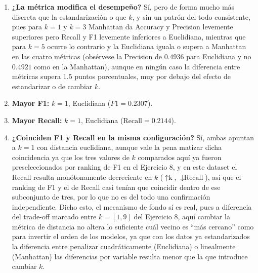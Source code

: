 \begin{enumerate}

\item \textbf{¿La métrica modifica el desempeño?}
Sí, pero de forma mucho más discreta que la estandarización o que $k$,
y sin un patrón del todo consistente, pues para $k=1$ y $k=3$ Manhattan
da Accuracy y Precision levemente superiores pero Recall y F1
levemente inferiores a Euclidiana, mientras que para $k=5$ ocurre lo
contrario y la Euclidiana iguala o supera a Manhattan en las cuatro
métricas (obsérvese la Precision de $0.4936$ para Euclidiana y no
$0.4921$ como en la Manhattan), aunque en ningún caso la diferencia entre
métricas supera $1.5$ puntos porcentuales, muy por debajo del efecto
de estandarizar o de cambiar $k$.

\item \textbf{Mayor F1:} $k=1$, Euclidiana ($F1=0.2307$).

\item \textbf{Mayor Recall:} $k=1$, Euclidiana ($\text{Recall}=0.2144$).

\item \textbf{¿Coinciden F1 y Recall en la misma configuración?}
Sí, ambas apuntan a $k=1$ con distancia euclidiana, aunque vale la pena
matizar dicha coincidencia ya que los tres valores de $k$ comparados
aquí ya fueron preseleccionados por ranking de F1 en el Ejercicio 8, y
en este dataset el Recall resulta monótonamente decreciente en $k$ ($\uparrow \text{k}$, $\downarrow \text{Recall}$), así que el ranking de F1 y el de Recall casi
tenían que coincidir dentro de ese subconjunto de tres, por lo que no
es del todo una confirmación independiente. Dicho esto, el mecanismo
de fondo sí es real, pues a diferencia del trade-off marcado entre
$k=[1,9]$ del Ejercicio 8, aquí cambiar la métrica de distancia no
altera lo suficiente cuál vecino es ``más cercano'' como para invertir
el orden de los modelos, ya que con los datos ya estandarizados la
diferencia entre penalizar cuadráticamente (Euclidiana) o linealmente
(Manhattan) las diferencias por variable resulta menor que la que
introduce cambiar $k$.

\end{enumerate}
